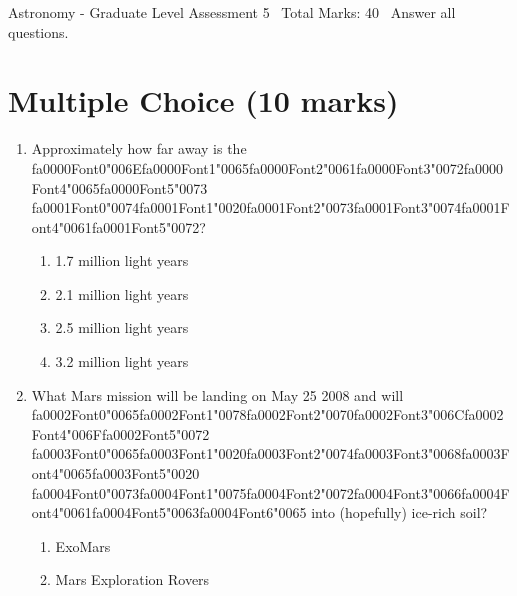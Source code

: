 \documentclass[12pt]{article}
\begin{document}
\begin{center}
Astronomy - Graduate Level Assessment 5 \
Total Marks: 40 \
Answer all questions.
\end{center}

\section*{Multiple Choice (10 marks)}
\begin{enumerate}[label=\arabic*.]
\item Approximately how far away is the {\csname fa0000Font0\endcsname\char"006E}{\csname fa0000Font1\endcsname\char"0065}{\csname fa0000Font2\endcsname\char"0061}{\csname fa0000Font3\endcsname\char"0072}{\csname fa0000Font4\endcsname\char"0065}{\csname fa0000Font5\endcsname\char"0073} {\csname fa0001Font0\endcsname\char"0074}{\csname fa0001Font1\endcsname\char"0020}{\csname fa0001Font2\endcsname\char"0073}{\csname fa0001Font3\endcsname\char"0074}{\csname fa0001Font4\endcsname\char"0061}{\csname fa0001Font5\endcsname\char"0072}?
\begin{enumerate}[label=(\alph*)]
    \item 1.7 million light years
    \item 2.1 million light years
    \item 2.5 million light years
    \item 3.2 million light years
\end{enumerate}
\item What Mars mission will be landing on May 25 2008 and will {\csname fa0002Font0\endcsname\char"0065}{\csname fa0002Font1\endcsname\char"0078}{\csname fa0002Font2\endcsname\char"0070}{\csname fa0002Font3\endcsname\char"006C}{\csname fa0002Font4\endcsname\char"006F}{\csname fa0002Font5\endcsname\char"0072} {\csname fa0003Font0\endcsname\char"0065}{\csname fa0003Font1\endcsname\char"0020}{\csname fa0003Font2\endcsname\char"0074}{\csname fa0003Font3\endcsname\char"0068}{\csname fa0003Font4\endcsname\char"0065}{\csname fa0003Font5\endcsname\char"0020} {\csname fa0004Font0\endcsname\char"0073}{\csname fa0004Font1\endcsname\char"0075}{\csname fa0004Font2\endcsname\char"0072}{\csname fa0004Font3\endcsname\char"0066}{\csname fa0004Font4\endcsname\char"0061}{\csname fa0004Font5\endcsname\char"0063}{\csname fa0004Font6\endcsname\char"0065} into (hopefully)
ice-rich soil?
\begin{enumerate}[label=(\alph*)]
    \item ExoMars
    \item Mars Exploration Rovers

\end{enumerate}
\end{enumerate}
\end{document}
